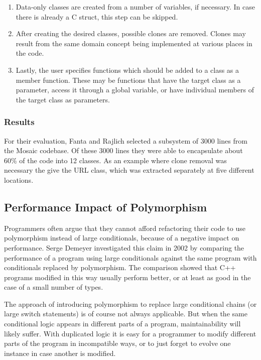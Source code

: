 \documentclass[conference,compsoc,a4paper]{IEEEtran}
\newcommand{\code}[1]{{\small\ttfamily #1}}
\begin{document}
\begin{enumerate}
  \item Data-only classes are created from a number of variables, if necessary. In case there is already a C 
  \code{struct}, this step can be skipped.
  
  \item After creating the desired classes, possible clones are removed. Clones may result from the same domain concept 
  being implemented at various places in the code.
  
  \item Lastly, the user specifies functions which should be added to a class as a member function. These may be 
  functions that have the target class as a parameter, access it through a global variable, or have individual members 
  of the target class as parameters.
\end{enumerate}

\subsubsection{Results}

For their evaluation, Fanta and Rajlich selected a subsystem of 3000 lines from the Mosaic codebase. Of these 3000 
lines they were able to encapsulate about 60\% of the code into 12 classes. As an example where clone removal was 
necessary the give the URL class, which was extracted separately at five different locations.

\subsection{Performance Impact of Polymorphism} \label{sec:polymorphism}

Programmers often argue that they cannot afford refactoring their code to use polymorphism instead of large 
conditionals, because of a negative impact on performance. Serge Demeyer investigated this claim in 2002 
\cite{polymorphism} by comparing the performance of a program using large conditionals against the same program with 
conditionals replaced by polymorphism. The comparison showed that C++ programs modified in this way usually perform 
better, or at least as good in the case of a small number of types.

The approach of introducing polymorphism to replace large conditional chains (or large \code{switch} statements) is of 
course not always applicable. But when the same conditional logic appears in different parts of a program, 
maintainability will likely suffer. With duplicated logic it is easy for a programmer to modify different parts of the 
program in incompatible ways, or to just forget to evolve one instance in case another is modified.
\end{document}
